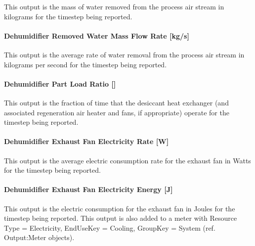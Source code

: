 This output is the mass of water removed from the process air stream in kilograms for the timestep being reported.

\paragraph{Dehumidifier Removed Water Mass Flow Rate {[}kg/s{]}}\label{dehumidifier-removed-water-mass-flow-rate-kgs-1}

This output is the average rate of water removal from the process air stream in kilograms per second for the timestep being reported.

\paragraph{Dehumidifier Part Load Ratio {[]}}\label{dehumidifier-part-load-ratio-1}

This output is the fraction of time that the desiccant heat exchanger (and associated regeneration air heater and fans, if appropriate) operate for the timestep being reported.

\paragraph{Dehumidifier Exhaust Fan Electricity Rate {[}W{]}}\label{dehumidifier-exhaust-fan-electric-power-w}

This output is the average electric consumption rate for the exhaust fan in Watts for the timestep being reported.

\paragraph{Dehumidifier Exhaust Fan Electricity Energy {[}J{]}}\label{dehumidifier-exhaust-fan-electric-energy-j}

This output is the electric consumption for the exhaust fan in Joules for the timestep being reported. This output is also added to a meter with Resource Type = Electricity, EndUseKey = Cooling, GroupKey = System (ref. Output:Meter objects).